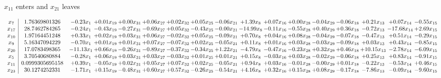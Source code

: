 \documentclass[9pt]{article}
\begin{document}
 $ x_{11} $ enters and $ x_{21} $ leaves 

 \[\begin{array}{c| c c@{\hskip 2pt} c@{\hskip 2pt} c@{\hskip 2pt} c@{\hskip 2pt} c@{\hskip 2pt} c@{\hskip 2pt} c@{\hskip 2pt} c@{\hskip 2pt} c@{\hskip 2pt} c@{\hskip 2pt} c@{\hskip 2pt} c@{\hskip 2pt} c@{\hskip 2pt} c@{\hskip 2pt} c@{\hskip 2pt} }
 x_{7}   &  1.76369801326 & -0.23 x_{1} & +  0.01 x_{19} & +  0.00 x_{31} & +  0.06 x_{27} & +  0.02 x_{32} & +  0.05 x_{25} & -0.06 x_{21} & +  1.39 x_{8} & +  0.07 x_{16} & +  0.00 x_{28} & -0.04 x_{29} & -0.06 x_{18} & +  0.21 x_{13} & +  0.07 x_{14} & -0.55 x_{15}\\
 x_{17}   &  28.7462784265 & -0.24 x_{1} & -0.43 x_{19} & -0.27 x_{31} & -0.69 x_{27} & +  0.05 x_{32} & -0.43 x_{25} & -0.00 x_{21} & -14.99 x_{8} & -0.11 x_{16} & -0.55 x_{28} & +  0.40 x_{29} & +  0.36 x_{18} & -0.72 x_{13} & -17.68 x_{14} & +  2.69 x_{15}\\
 x_{10}   &  1.97164451248 & +  0.33 x_{1} & +  0.02 x_{19} & +  0.03 x_{31} & +  0.06 x_{27} & -0.02 x_{32} & +  0.05 x_{25} & -0.09 x_{21} & +  0.70 x_{8} & +  0.04 x_{16} & +  0.08 x_{28} & -0.04 x_{29} & -0.07 x_{18} & -0.47 x_{13} & +  0.51 x_{14} & -0.29 x_{15}\\
 x_{9}   &  5.16347094229 & -0.70 x_{1} & +  0.01 x_{19} & +  0.01 x_{31} & +  0.07 x_{27} & -0.07 x_{32} & +  0.02 x_{25} & -0.05 x_{21} & +  0.11 x_{8} & +  0.01 x_{16} & +  0.03 x_{28} & -0.03 x_{29} & -0.09 x_{18} & +  0.03 x_{13} & +  0.43 x_{14} & -0.85 x_{15}\\
 x_{20}   &  17.0783498365 & -11.13 x_{1} & +  0.66 x_{19} & -0.26 x_{31} & -0.89 x_{27} & -0.37 x_{32} & -0.34 x_{25} & +  1.22 x_{21} & -4.79 x_{8} & -0.47 x_{16} & -0.23 x_{28} & +  0.32 x_{29} & +  0.46 x_{18} & + 10.15 x_{13} & -2.78 x_{14} & -6.09 x_{15}\\
 x_{5}   &  3.70540680884 & -0.28 x_{1} & +  0.06 x_{19} & +  0.03 x_{31} & +  0.03 x_{27} & -0.03 x_{32} & +  0.01 x_{25} & +  0.01 x_{21} & +  0.15 x_{8} & -0.03 x_{16} & +  0.03 x_{28} & -0.02 x_{29} & -0.06 x_{18} & +  0.25 x_{13} & +  0.83 x_{14} & -0.91 x_{15}\\
 x_{11}   &  0.0999305695158 & +  0.39 x_{1} & -0.05 x_{19} & +  0.02 x_{31} & +  0.05 x_{27} & +  0.07 x_{32} & +  0.02 x_{25} & -0.05 x_{21} & +  0.94 x_{8} & +  0.03 x_{16} & -0.01 x_{28} & -0.00 x_{29} & +  0.01 x_{18} & -0.22 x_{13} & -0.53 x_{14} & +  0.46 x_{15}\\
 x_{23}   &  30.1274252331 & -1.71 x_{1} & +  0.15 x_{19} & -0.48 x_{31} & +  0.60 x_{27} & +  0.57 x_{32} & -0.26 x_{25} & -0.54 x_{21} & +  4.16 x_{8} & +  0.32 x_{16} & +  0.15 x_{28} & +  0.08 x_{29} & -0.17 x_{18} & -7.86 x_{13} & -0.09 x_{14} & -9.60 x_{15}\\

\end{array}\]
\end{document}
